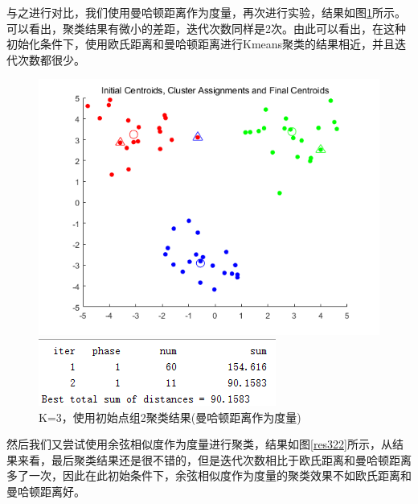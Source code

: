 \documentclass[cn]{elegantbook}
\begin{document}
与之进行对比，我们使用曼哈顿距离作为度量，再次进行实验，结果如图\ref{res321}所示。可以看出，聚类结果有微小的差距，迭代次数同样是2次。由此可以看出，在这种初始化条件下，使用欧氏距离和曼哈顿距离进行Kmeans聚类的结果相近，并且迭代次数都很少。
\begin{figure}[!h]
	\centering
	\begin{minipage}{0.48\linewidth}
		\centering
		\includegraphics[width=\linewidth]{images/res322}
	\end{minipage}
	\begin{minipage}{0.48\linewidth}
		\centering
		\includegraphics[width=\linewidth]{images/res323}
	\end{minipage}
	\caption{\label{res321}K=3，使用初始点组2聚类结果(曼哈顿距离作为度量)}
\end{figure}

然后我们又尝试使用余弦相似度作为度量进行聚类，结果如图\ref{res322}所示，从结果来看，最后聚类结果还是很不错的，但是迭代次数相比于欧氏距离和曼哈顿距离多了一次，因此在此初始条件下，余弦相似度作为度量的聚类效果不如欧氏距离和曼哈顿距离好。
\end{document}
